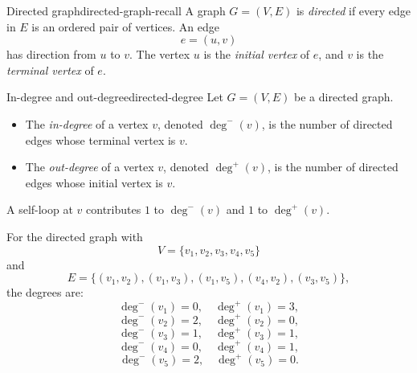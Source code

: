 \begin{definition}{Directed graph}{directed-graph-recall}
A graph \(G=(V,E)\) is \emph{directed} if every edge in \(E\) is an ordered pair of vertices. An edge
\[
e=(u,v)
\]
has direction from \(u\) to \(v\). The vertex \(u\) is the \emph{initial vertex} of \(e\), and \(v\) is the \emph{terminal vertex} of \(e\).
\end{definition}

\begin{definition}{In-degree and out-degree}{directed-degree}
Let \(G=(V,E)\) be a directed graph.
\begin{itemize}[leftmargin=*]
    \item The \emph{in-degree} of a vertex \(v\), denoted \(\deg^{-}(v)\), is the number of directed edges whose terminal vertex is \(v\).
    \item The \emph{out-degree} of a vertex \(v\), denoted \(\deg^{+}(v)\), is the number of directed edges whose initial vertex is \(v\).
\end{itemize}
A self-loop at \(v\) contributes \(1\) to \(\deg^{-}(v)\) and \(1\) to \(\deg^{+}(v)\).
\end{definition}

\begin{center}
\end{center}

\begin{examplebox}[title={Directed degree calculation}]
For the directed graph with
\[
V=\{v_1,v_2,v_3,v_4,v_5\}
\]
and
\[
E=\{(v_1,v_2),(v_1,v_3),(v_1,v_5),(v_4,v_2),(v_3,v_5)\},
\]
the degrees are:
\[
\deg^{-}(v_1)=0,\quad \deg^{+}(v_1)=3,
\]
\[
\deg^{-}(v_2)=2,\quad \deg^{+}(v_2)=0,
\]
\[
\deg^{-}(v_3)=1,\quad \deg^{+}(v_3)=1,
\]
\[
\deg^{-}(v_4)=0,\quad \deg^{+}(v_4)=1,
\]
\[
\deg^{-}(v_5)=2,\quad \deg^{+}(v_5)=0.
\]
\end{examplebox}

